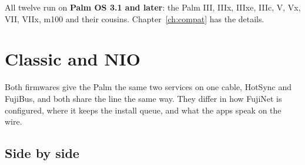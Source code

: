 \documentclass[11pt,letterpaper,openany]{book}
\begin{document}
All twelve run on \textbf{Palm OS 3.1 and later}: the Palm III, IIIx, IIIxe,
IIIc, V, Vx, VII, VIIx, m100 and their cousins. Chapter~\ref{ch:compat} has the
details.

\chapter{Classic and NIO}
\label{ch:diff}

Both firmwares give the Palm the same two services on one cable, HotSync and
FujiBus, and both share the line the same way. They differ in how FujiNet is
configured, where it keeps the install queue, and what the apps speak on the
wire.

\section{Side by side}
\end{document}
